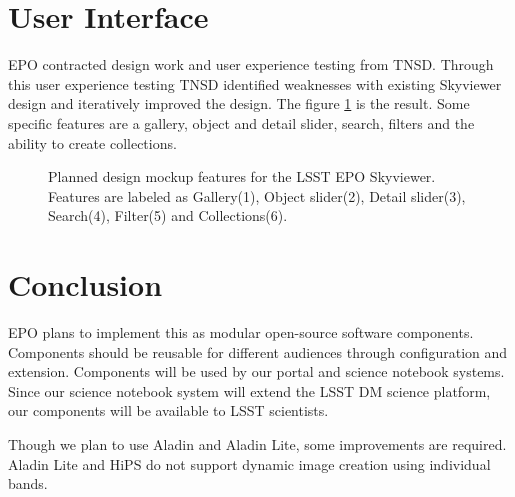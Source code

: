 \documentclass[11pt,twoside]{article}
\begin{document}
\section{User Interface}

EPO contracted design work and user experience testing from TNSD. Through this user experience testing TNSD identified weaknesses with existing Skyviewer design and iteratively improved the design. The figure \ref{P1-140_fig1} is the result. Some specific features are a gallery, object and detail slider, search, filters and the ability to create collections.

\begin{figure}[!ht]
  \caption{Planned design mockup features for the LSST EPO Skyviewer. Features are labeled as Gallery(1), Object slider(2), Detail slider(3), Search(4), Filter(5) and Collections(6).}
  \label{P1-140_fig1}
\end{figure}





\section{Conclusion}
EPO plans to implement this as modular open-source software components. Components should be reusable for different audiences through configuration and extension. Components will be used by our portal and science notebook systems. Since our science notebook system will extend the LSST DM science platform\citep{2017LSST.1.LDM-542}, our components will be available to LSST scientists.

Though we plan to use Aladin and Aladin Lite, some improvements are required. Aladin Lite and HiPS do not support dynamic image creation using individual bands.
\end{document}
